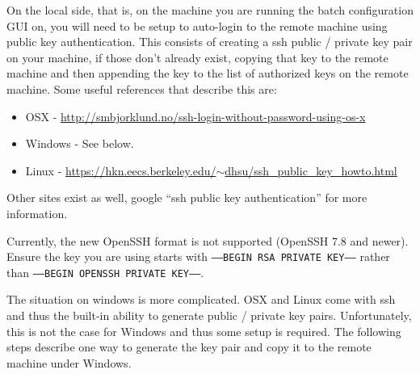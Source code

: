 \documentclass[11pt]{amsart}
\begin{document}
On the local side, that is, on the machine you are running the batch configuration GUI on, you will need to be setup to auto-login to the remote machine using public key authentication. This consists of creating a ssh public / private key pair on your machine, if those don't already exist, copying that key to the remote machine and then appending the key to the list of authorized keys on the remote machine. Some useful references that describe this are:

\begin{itemize}
\item OSX - \href{http://smbjorklund.no/ssh-login-without-password-using-os-x}{http://smbjorklund.no/ssh-login-without-password-using-os-x}
\item Windows - See below.
\item Linux - \href{https://hkn.eecs.berkeley.edu/~dhsu/ssh_public_key_howto.html}{https://hkn.eecs.berkeley.edu/$\sim$dhsu/ssh\_public\_key\_howto.html}
\end{itemize}

\noindent
Other sites exist as well,  google ``ssh public key authentication'' for more information.

Currently, the new OpenSSH format is not supported (OpenSSH 7.8 and newer). Ensure the key you are using starts with {\tt-----BEGIN RSA PRIVATE KEY-----} rather than {\tt-----BEGIN OPENSSH PRIVATE KEY-----}.

The situation on windows is more complicated. OSX and Linux come with ssh and thus the built-in ability to generate public / private key pairs. Unfortunately, this is not the case for Windows and thus some setup is required. The following steps describe one way to generate the key pair and copy it to the remote machine under Windows.
\end{document}
